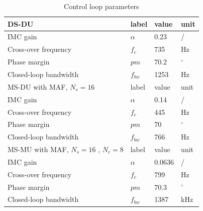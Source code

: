 \documentclass[conference]{IEEEtran}
\begin{document}
\begin{table}[h!]
			  \caption{Control loop parameters}
              \label{tab:an_param}
              \centering
              \begin{tabular}{llll}
                           \midrule\midrule
        DS-DU & label & value   & unit\\
        \midrule               
                  IMC gain	& $\alpha$ & 0.23 & /\\  
                  Cross-over frequency  & $f_{c}$ & 735 & Hz   \\
                  Phase margin  & $pm$ & 70.2 &  $^\circ$  \\
                  Closed-loop bandwidth  & $f_{bw}$ & 1253 & Hz   \\
                  \midrule\midrule

        MS-DU with MAF, $N_s = 16$ & label & value   & unit\\
        \midrule               
                  IMC gain	& $\alpha$ & 0.14 & /\\  
                  Cross-over frequency  & $f_{c}$ & 445 & Hz   \\
                  Phase margin  & $pm$ & 70 &  $^\circ$  \\
                  Closed-loop bandwidth  & $f_{bw}$ & 766 & Hz   \\
                  \midrule\midrule
      MS-MU with MAF, $N_s = 16$ , $N_c =  8$ & label & value   & unit\\
        \midrule               
                  IMC gain	& $\alpha$ & 0.0636 & /\\  
                  Cross-over frequency  & $f_{c}$ & 799 & Hz   \\
                  Phase margin  & $pm$ & 70.3 &  $^\circ$  \\
                  Closed-loop bandwidth  & $f_{bw}$ & 1387 & kHz   \\
                  \midrule\midrule
                                                        
              \end{tabular}
\end{table}
\end{document}
